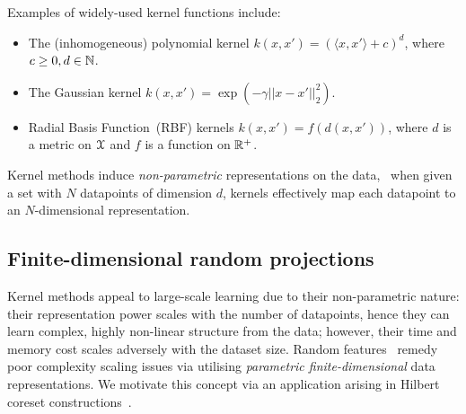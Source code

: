 Examples of widely-used kernel functions include:
\begin{itemize}
	\item The (inhomogeneous) polynomial kernel $k(x,x') = \left(\langle x, x'\rangle + c\right)^d$, where $ {c \geq 0}, {d \in \mathbb{N}}$.
	\item The Gaussian kernel $k(x,x') = \exp(-\gamma||x-x'||_{2}^2)$.
	\item Radial Basis Function~(RBF) kernels $k(x,x') = f(d(x,x'))$, where $d$ is a metric on $\mathcal{X}$ and $f$ is a function on $\mathbb{R}^{+}$.
\end{itemize}

Kernel methods induce \emph{non-parametric} representations on the data, \ie~when given a set with $ N $ datapoints of dimension $d$, kernels effectively map each datapoint to an $N$-dimensional representation. %

\subsection{Finite-dimensional random projections}
\label{subsec:b-random-features}

Kernel methods appeal to large-scale learning due to their non-parametric nature: their representation power scales with the number of datapoints, hence they can learn complex, highly non-linear structure from the data; however, their time and memory cost scales adversely with the dataset size. Random features~\citep{rahimi08} remedy poor complexity scaling issues via utilising \emph{parametric finite-dimensional} data representations. We motivate this concept via an application arising in Hilbert coreset constructions~\citep{campbell19jmlr}.

